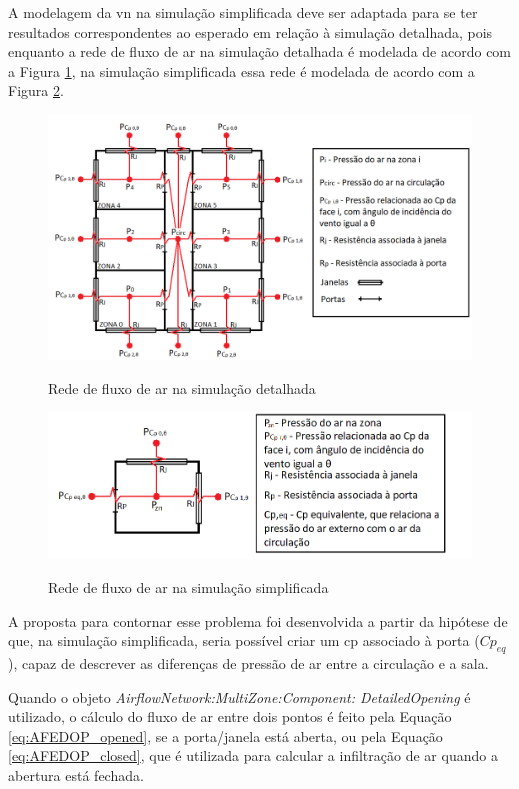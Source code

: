 \documentclass[brazil,hardcopy,openany]{ufscthesis} %
\begin{document}
A modelagem da \acrlong{vn} na simulação simplificada deve ser adaptada para se ter resultados correspondentes ao esperado em relação à simulação detalhada, pois enquanto a rede de fluxo de ar na simulação detalhada é modelada de acordo com a Figura \ref{fig:AFN_ref}, na simulação simplificada essa rede é modelada de acordo com a Figura \ref{fig:AFN_sz}.	

\vspace{20pt}
\begin{figure}[h]
	\centering
	\caption{Rede de fluxo de ar na simulação detalhada}
	\includegraphics[width=1\linewidth]{img/AFN_ref2.png}
	\label{fig:AFN_ref}
\end{figure}	

\begin{figure}[h]
	\centering
	\caption{Rede de fluxo de ar na simulação simplificada}
	\includegraphics[width=.8\linewidth]{img/AFN_sz2.png}
	\label{fig:AFN_sz}
\end{figure}
\newpage
A proposta para contornar esse problema foi desenvolvida a partir da hipótese de que, na simulação simplificada, seria possível criar um \acrshort{cp} associado à porta ($Cp_{eq}$), capaz de descrever as diferenças de pressão de ar entre a circulação e a sala.  %

Quando o objeto \textit{AirflowNetwork:MultiZone:Component: DetailedOpening} é utilizado, o cálculo do fluxo de ar entre dois pontos é feito pela Equação \ref{eq:AFEDOP_opened}, se a porta/janela está aberta, ou pela Equação \ref{eq:AFEDOP_closed}, que é utilizada para calcular a infiltração de ar quando a abertura está fechada.
\end{document}
